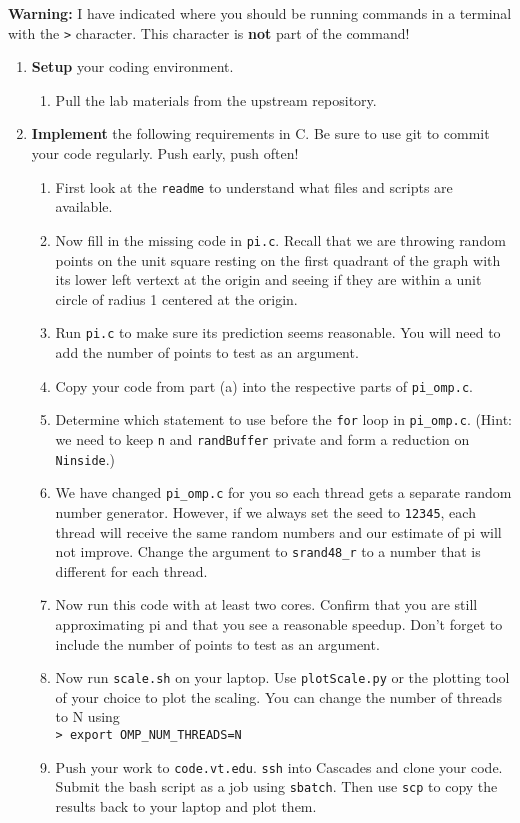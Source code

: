 \documentclass[letter]{article}
\begin{document}
\textbf{Warning:} I have indicated where you should be running commands in a terminal with the \texttt{>} character.  This character is \textbf{not} part of the command!

\begin{enumerate}

    \item \textbf{Setup} your coding environment.
        \begin{enumerate}
            \item Pull the lab materials from the upstream repository.
        \end{enumerate}

    \item \textbf{Implement} the following requirements in C.  Be sure to use git to commit your code regularly.  Push early, push often!
        \begin{enumerate}
            \item First look at the \texttt{readme} to understand what files and scripts are available.
            \item Now fill in the missing code in \texttt{pi.c}. Recall that we are throwing random points on the unit square resting on the first quadrant of the graph with its lower left vertext at the origin and seeing if they are within a unit circle of radius 1 centered at the origin. 
            \item Run \texttt{pi.c} to make sure its prediction seems reasonable.  You will need to add the number of points to test as an argument.
            \item Copy your code from part (a) into the respective parts of \texttt{pi\_omp.c}.
            \item Determine which statement to use before the \texttt{for} loop in \texttt{pi\_omp.c}. (Hint: we need to keep \texttt{n} and \texttt{randBuffer} private and form a reduction on \texttt{Ninside}.)
            \item We have changed \texttt{pi\_omp.c} for you so each thread gets a separate random number generator.  However, if we always set the seed to \texttt{12345}, each thread will receive the same random numbers and our estimate of pi will not improve.  Change the argument to \texttt{srand48\_r} to a number that is different for each thread.  
            \item Now run this code with at least two cores. Confirm that you are still approximating pi and that you see a reasonable speedup.  Don't forget to include the number of points to test as an argument.
            \item Now run \texttt{scale.sh} on your laptop. Use \texttt{plotScale.py} or the plotting tool of your choice to plot the scaling.  You can change the number of threads to N using\\
            \texttt{> export OMP\_NUM\_THREADS=N} 
            \item Push your work to \texttt{code.vt.edu}. \texttt{ssh} into Cascades and clone your code. Submit the bash script as a job using \texttt{sbatch}. Then use \texttt{scp} to copy the results back to your laptop and plot them.  
        \end{enumerate}
            

\end{enumerate}
\end{document}
